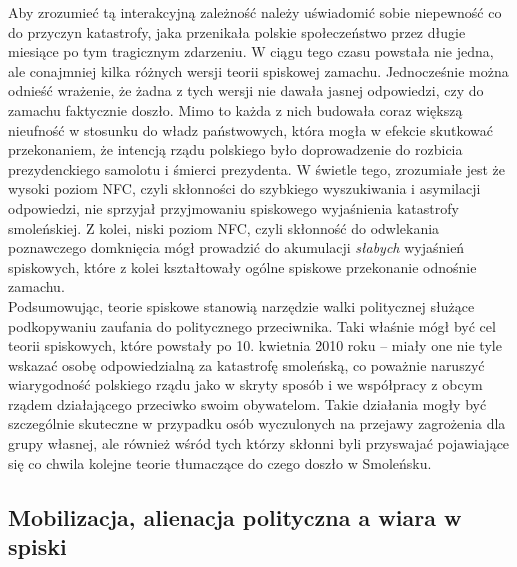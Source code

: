 \documentclass[man]{apa6}
\begin{document}
    Aby zrozumieć tą interakcyjną zależność należy uświadomić sobie niepewność co do przyczyn katastrofy, jaka przenikała polskie społeczeństwo przez długie miesiące po tym tragicznym zdarzeniu. W ciągu tego czasu powstała nie jedna, ale conajmniej kilka różnych wersji teorii spiskowej zamachu. Jednocześnie można odnieść wrażenie, że żadna z tych wersji nie dawała jasnej odpowiedzi, czy do zamachu faktycznie doszło. Mimo to każda z nich budowała coraz większą nieufność w stosunku do władz państwowych, która mogła w efekcie skutkować przekonaniem, że intencją rządu polskiego było doprowadzenie do rozbicia prezydenckiego samolotu i śmierci prezydenta. W świetle tego, zrozumiałe jest że wysoki poziom NFC, czyli skłonności do szybkiego wyszukiwania i asymilacji odpowiedzi, nie sprzyjał przyjmowaniu spiskowego wyjaśnienia katastrofy smoleńskiej. Z kolei, niski poziom NFC, czyli skłonność do odwlekania poznawczego domknięcia mógł prowadzić do akumulacji \emph{słabych} wyjaśnień spiskowych, które z kolei kształtowały ogólne spiskowe przekonanie odnośnie zamachu.\\
    Podsumowując, teorie spiskowe stanowią narzędzie walki politycznej służące podkopywaniu zaufania do politycznego przeciwnika. Taki właśnie mógł być cel teorii spiskowych, które powstały po 10. kwietnia 2010 roku -- miały one nie tyle wskazać osobę odpowiedzialną za katastrofę smoleńską, co poważnie naruszyć wiarygodność polskiego rządu jako w skryty sposób i we współpracy z obcym rządem działającego przeciwko swoim obywatelom. Takie działania mogły być szczególnie skuteczne w przypadku osób wyczulonych na przejawy zagrożenia dla grupy własnej, ale również wśród tych którzy skłonni byli przyswajać pojawiające się co chwila kolejne teorie tłumaczące do czego doszło w Smoleńsku.

    \subsection{Mobilizacja, alienacja polityczna a wiara w spiski}
\end{document}
